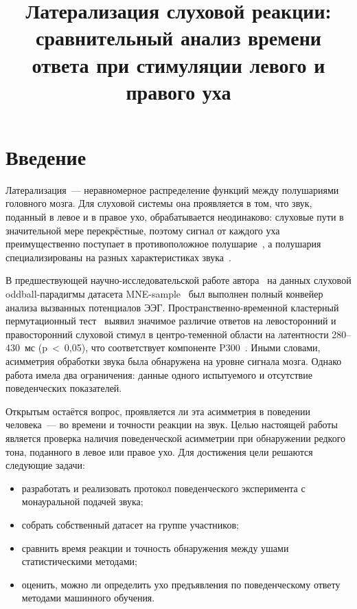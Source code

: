 \documentclass{misisarticle}
\title{Латерализация слуховой реакции: сравнительный анализ времени ответа при стимуляции левого и правого уха}
\begin{document}
\maketitle

\section{Введение}

Латерализация~--- неравномерное распределение функций между полушариями головного мозга. Для слуховой системы она проявляется в том, что звук, поданный в левое и в правое ухо, обрабатывается неодинаково: слуховые пути в значительной мере перекрёстные, поэтому сигнал от каждого уха преимущественно поступает в противоположное полушарие~\cite{naatanen1987}, а полушария специализированы на разных характеристиках звука~\cite{kimura1961, kimura1964}.

В предшествующей научно-исследовательской работе автора~\cite{gorchakova2026} на данных слуховой oddball-парадигмы датасета MNE-sample~\cite{gramfort2013} был выполнен полный конвейер анализа вызванных потенциалов ЭЭГ. Пространственно-временной кластерный пермутационный тест~\cite{maris2007} выявил значимое различие ответов на левосторонний и правосторонний слуховой стимул в центро-теменной области на латентности 280--430~мс (p~<~0{,}05), что соответствует компоненте P300~\cite{polich2007}. Иными словами, асимметрия обработки звука была обнаружена на уровне сигнала мозга. Однако работа имела два ограничения: данные одного испытуемого и отсутствие поведенческих показателей.

Открытым остаётся вопрос, проявляется ли эта асимметрия в поведении человека~--- во времени и точности реакции на звук. Целью настоящей работы является проверка наличия поведенческой асимметрии при обнаружении редкого тона, поданного в левое или правое ухо. Для достижения цели решаются следующие задачи:
\begin{itemize}
  \item разработать и реализовать протокол поведенческого эксперимента с монауральной подачей звука;
  \item собрать собственный датасет на группе участников;
  \item сравнить время реакции и точность обнаружения между ушами статистическими методами;
  \item оценить, можно ли определить ухо предъявления по поведенческому ответу методами машинного обучения.
\end{itemize}
\end{document}

